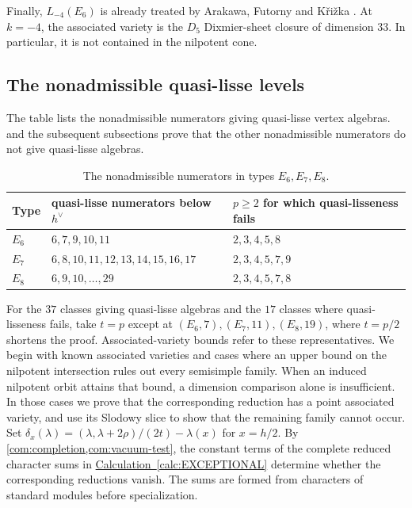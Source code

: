 \documentclass[11pt,a4paper]{amsart}
\numberwithin{equation}{section}
\theoremstyle{definition}
\theoremstyle{remark}
\begin{document}
Finally, $L_{-4}(E_6)$ is already treated by Arakawa, Futorny and K\v{r}i\v{z}ka \cite[Theorem~3.24 and Table~6]{ArakawaFutornyKrizka2024}. At $k=-4$,
the associated variety is the $D_5$ Dixmier-sheet closure of dimension
$33$. In particular, it is not contained in the nilpotent cone.


\subsection{The nonadmissible quasi-lisse levels}\label{exc:seeds}
The table lists the nonadmissible numerators giving quasi-lisse vertex
algebras.  and the subsequent subsections prove that
the other nonadmissible numerators do not give quasi-lisse algebras.

\begin{table}[htbp]\centering\small
\begin{tabular}{@{}lll@{}}\toprule
Type&quasi-lisse numerators below $h^\vee$&$p\ge2$ for which quasi-lisseness fails\\\midrule
$E_6$&$6,7,9,10,11$&$2,3,4,5,8$\\
$E_7$&$6,8,10,11,12,13,14,15,16,17$&$2,3,4,5,7,9$\\
$E_8$&$6,9,10,\ldots,29$&$2,3,4,5,7,8$\\\bottomrule
\end{tabular}
\par\smallskip
\caption{The nonadmissible numerators in types $E_6,E_7,E_8$.}
\label{exc:coverage}\end{table}

For the $37$ classes giving quasi-lisse algebras and the $17$
classes where quasi-lisseness fails, take $t=p$ except
at $(E_6,7),(E_7,11),(E_8,19)$, where $t=p/2$ shortens the proof.
Associated-variety bounds refer to these representatives.
We begin with known associated varieties and cases where an upper
bound on the nilpotent intersection rules out every semisimple family.
When an induced nilpotent orbit attains that bound, a dimension
comparison alone is insufficient. In those cases we prove that the
corresponding reduction has a point associated variety, and use its
Slodowy slice to show that the remaining family cannot occur.
Set $\delta_x(\lambda)=(\lambda,\lambda+2\rho)/(2t)-\lambda(x)$
for $x=h/2$. By \cref{com:completion,com:vacuum-test}, the constant terms of the
complete reduced character sums in
\hyperref[calc:EXCEPTIONAL]{Calculation~\ref*{calc:EXCEPTIONAL}}
determine whether the corresponding reductions vanish. The sums are
formed from characters of standard modules before specialization.
\end{document}
